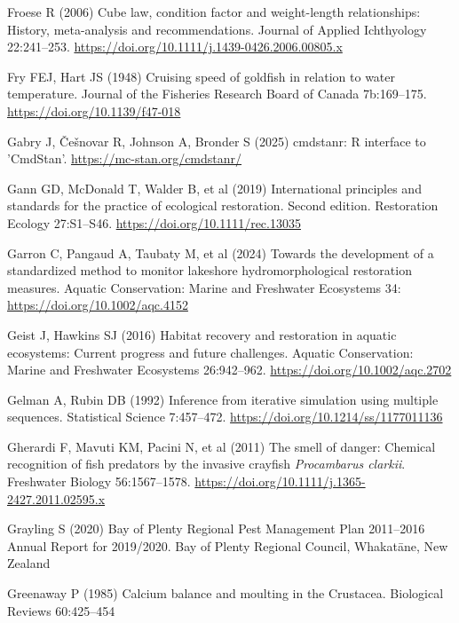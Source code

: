 \documentclass[
  12pt,
  a4paper,
  oneside]{scrbook}
\newlength{\cslhangindent}
\newenvironment{CSLReferences}[2] %
 {\begin{list}{}{%
  \setlength{\itemindent}{0pt}
  \setlength{\leftmargin}{0pt}
  \setlength{\parsep}{0pt}
  \ifodd #1
   \setlength{\leftmargin}{\cslhangindent}
   \setlength{\itemindent}{-1\cslhangindent}
  \fi
  \setlength{\itemsep}{#2\baselineskip}}}
 {\end{list}}
\renewenvironment{CSLReferences}[2]
   {\begin{list}{}{%
    \setlength{\itemindent}{0pt}
    \setlength{\leftmargin}{0pt}
    \setlength{\parsep}{0pt}
    \ifodd #1
     \setlength{\leftmargin}{\cslhangindent}
     \setlength{\itemindent}{-1\cslhangindent}
    \fi
    \setlength{\itemsep}{0.3\baselineskip}}}
   {\end{list}}%
\begin{document}
\begin{CSLReferences}{1}{1}
Froese R (2006) Cube law, condition factor and weight-length
relationships: History, meta-analysis and recommendations. Journal of
Applied Ichthyology 22:241--253.
\url{https://doi.org/10.1111/j.1439-0426.2006.00805.x}

Fry FEJ, Hart JS (1948) Cruising speed of goldfish in relation to water
temperature. Journal of the Fisheries Research Board of Canada
7b:169--175. \url{https://doi.org/10.1139/f47-018}

Gabry J, Češnovar R, Johnson A, Bronder S (2025) {cmdstanr}: {R}
interface to '{CmdStan}'. \url{https://mc-stan.org/cmdstanr/}

Gann GD, McDonald T, Walder B, et al (2019) International principles and
standards for the practice of ecological restoration. {Second edition}.
Restoration Ecology 27:S1--S46. \url{https://doi.org/10.1111/rec.13035}

Garron C, Pangaud A, Taubaty M, et al (2024) Towards the development of
a standardized method to monitor lakeshore hydromorphological
restoration measures. Aquatic Conservation: Marine and Freshwater
Ecosystems 34: \url{https://doi.org/10.1002/aqc.4152}

Geist J, Hawkins SJ (2016) Habitat recovery and restoration in aquatic
ecosystems: Current progress and future challenges. Aquatic
Conservation: Marine and Freshwater Ecosystems 26:942--962.
\url{https://doi.org/10.1002/aqc.2702}

Gelman A, Rubin DB (1992) Inference from iterative simulation using
multiple sequences. Statistical Science 7:457--472.
\url{https://doi.org/10.1214/ss/1177011136}

Gherardi F, Mavuti KM, Pacini N, et al (2011) The smell of danger:
Chemical recognition of fish predators by the invasive crayfish
{\emph{Procambarus clarkii}}. Freshwater Biology 56:1567--1578.
\url{https://doi.org/10.1111/j.1365-2427.2011.02595.x}

Grayling S (2020) {Bay of Plenty Regional Pest Management Plan}
2011--2016 {Annual Report} for 2019/2020. Bay of Plenty Regional
Council, Whakatāne, New Zealand

Greenaway P (1985) Calcium balance and moulting in the {Crustacea}.
Biological Reviews 60:425--454


\end{CSLReferences}
\end{document}
